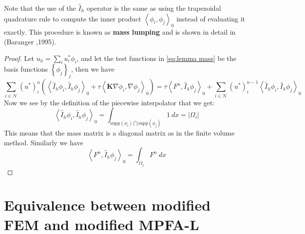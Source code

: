 \documentclass[../Main/main.tex]{subfiles}
\begin{document}
	\begin{remark}
		Note that the use of the $\hat{I}_h$ operator is the same as using the trapezoidal quadrature rule to compute the inner product $\left \langle \phi_i,\phi_j \right \rangle_0$ instead of evaluating it exactly.
		This procedure is known as \textbf{mass lumping} and is shown in detail in (Baranger \cite{baranger1996connection},1995).
	\end{remark}
	\begin{proof}
		Let $u_h = \sum_i u_i^* \phi_i$, and let the test functions in \eqref{eq:lemma mass} be the basis functions $\left \{ \phi_j \right \}_j$, then we have 
		\begin{equation}
		\sum_{i\in \mathcal{N}} (u^*)^n_i (\left \langle \hat{I}_h\phi_i,\hat{I}_h\phi_j\right \rangle_0 +\tau \left \langle  \pmb{K} \nabla \phi_i, \nabla \phi_j \right \rangle_0) = \tau \left \langle F^n,\hat{I}_h \phi_j \right \rangle_0 + \sum_{i\in \mathcal{N}} (u^*)^{n-1}_i \left \langle \hat{I}_h \phi_i,\hat{I}_h \phi_j \right \rangle_0
		\end{equation}
		Now we see by the definition of the piecewise interpolator that we get:
		\begin{equation}
			\left \langle \hat{I}_h\phi_i,\hat{I}_h\phi_j\right \rangle_0 = \int_{\text{supp}(\phi_i)\bigcap\text{supp}(\phi_j)} 1 \ dx = |\Omega_i|
		\end{equation}
		This means that the mass matrix is a diagonal matrix as in the finite volume method. Similarly we have 
		\begin{equation}
			\left \langle F^n,\hat{I}_h \phi_j \right \rangle_0 = \int_{\Omega_j}F^n \ dx
		\end{equation}
	\end{proof}
	\section*{Equivalence between modified FEM and modified MPFA-L}	
	
\end{document}
